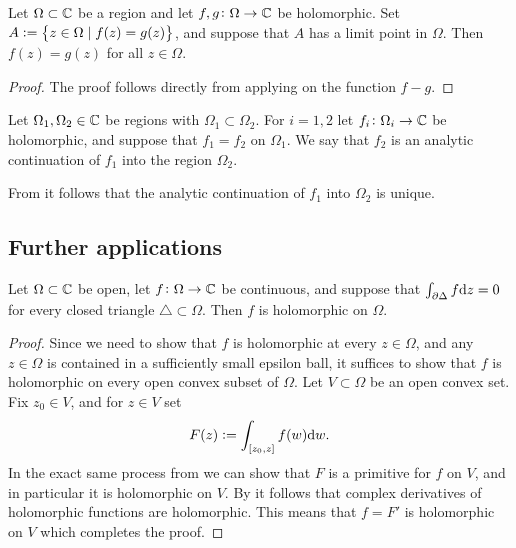 \documentclass[11pt,a4paper]{article}
\begin{document}
\begin{corollary}
  \label{cor:almost-equal-functions-are-equal}
  Let $\Omega \subset \mathbb{C}$ be a region and let $f,g \colon \Omega \to \mathbb{C}$
  be holomorphic.
  Set $A := \left\{z \in \Omega \mid f(z) = g(z)\right\}$,
  and suppose that $A$ has a limit point in $\Omega$.
  Then $f(z) = g(z)$ for all $z \in \Omega$.
\end{corollary}
\begin{proof}
  The proof follows directly from applying
  on the function $f - g$.
\end{proof}

\begin{definition}
  Let $\Omega_1, \Omega_2 \in \mathbb{C}$ be regions with $\Omega_1 \subset \Omega_2$.
  For $i = 1, 2$ let $f_i \colon \Omega_i \to \mathbb{C}$ be holomorphic,
  and suppose that $f_1 = f_2$ on $\Omega_1$.
  We say that $f_2$ is an analytic continuation of $f_1$ into the region
  $\Omega_2$.
\end{definition}
\begin{remark}
  From 
  it follows that the analytic continuation of $f_1$ into $\Omega_2$
  is unique.
\end{remark}

\subsection{Further applications}

\begin{theorem}
  Let $\Omega \subset \mathbb{C}$ be open,
  let $f \colon \Omega \to \mathbb{C}$ be continuous,
  and suppose that $\int_{\partial \Delta} f \mathrm{d} z = 0$ for every closed triangle
  $\triangle \subset \Omega$.
  Then $f$ is holomorphic on $\Omega$.
\end{theorem}
\begin{proof}
  Since we need to show that $f$ is holomorphic at every $z \in \Omega$,
  and any $z \in \Omega$ is contained in a sufficiently small epsilon ball,
  it suffices to show that $f$ is holomorphic on every open convex subset
  of $\Omega$.
  Let $V \subset \Omega$ be an open convex set.
  Fix $z_0 \in V$, and for $z \in V$ set
  \[
    F(z) := \int_{[z_0,z]} f(w) \mathrm{d} w.
  \]
  In the exact same process from  we can show that
  $F$ is a primitive for $f$ on $V$, and in particular it is holomorphic on $V$.
  By  it follows that complex derivatives of holomorphic
  functions are holomorphic.
  This means that $f = F'$ is holomorphic on $V$ which completes the proof.
\end{proof}
\end{document}
